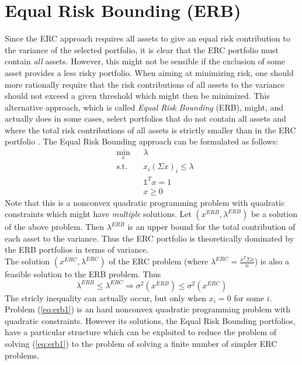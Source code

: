 \section{Equal Risk Bounding (ERB)}
Since the ERC approach requires all assets to give an equal risk contribution to the variance of the selected portfolio, it is clear that the ERC portfolio must contain \textit{all} assets\footnotemark[4]. However, this might not be sensible if the exclusion of some asset provides a less risky portfolio. When aiming at minimizing risk, one should more rationally require that the risk contributions of all assets to the variance should not exceed a given threshold which might then be minimized. This alternative approach, which is called \textit{Equal Risk Bounding} (ERB), might, and actually does in some cases, select portfolios that do not contain all assets and where the total risk contributions of all assets is strictly smaller than in the ERC portfolio \cite{erb}. The Equal Risk Bounding approach can be formulated as follows:
\begin{equation}\label{eq:erb1}
\begin{aligned}
& \min_x
& & \lambda\\
& \text{s.t.}
& & x_i (\Sigma x)_i \leq \lambda\\
&&&\mathds{1}^T x =1\\
&&&x \geq 0
\end{aligned}
\end{equation}
Note that this is a nonconvex quadratic programming problem with quadratic constraints which might have \textit{multiple} solutions. Let $(x^{ERB},\lambda^{ERB})$ be a solution of the above problem. Then $\lambda^{ERB}$ is an upper bound for the total contribution of each asset to the variance. Thus the ERC portfolio is theoretically dominated by the ERB portfolios in terms of variance.\\
The solution $(x^{ERC},\lambda^{ERC})$ of the ERC problem (where $\lambda^{ERC} = \frac{x^{T} \Sigma x}{n}$) is also a feasible solution to the ERB problem. Thus
\begin{equation}
\lambda^{ERB} \leq \lambda^{ERC} \Rightarrow \sigma^2(x^{ERB}) \leq \sigma^2(x^{ERC})
\end{equation}
The stricly inequality can actually occur, but only when $x_i=0$ for some $i$.\\
Problem (\ref{eq:erb1}) is an hard nonconvex quadratic programming problem with quadratic constraints. However its solutions, the Equal Risk Bounding portfolios, have a particular structure which can be exploited to reduce the problem of solving (\ref{eq:erb1}) to the problem of solving a finite number of simpler ERC problems.

